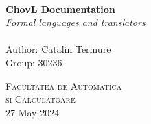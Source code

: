 \begin{titlepage}
    \begin{center}

        \HRule \\[0.4cm]
        { \LARGE
        \textbf{ChovL Documentation}\\[0.4cm]
        \emph{Formal languages and translators}\\[0.4cm]
        }
        \HRule \\[1.5cm]

        { \large
        Author: Catalin Termure \\[0.1cm]
        Group: 30236\\[0.1cm]
        }

        \vfill
        \textsc{\large Facultatea de Automatica\\si Calculatoare}\\[0.4cm]

        {\large 27 May 2024}

    \end{center}
\end{titlepage}